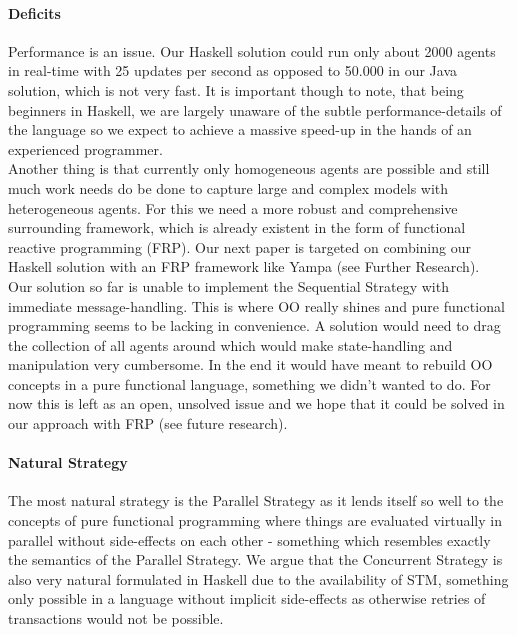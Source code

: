 \paragraph{Deficits}
Performance is an issue. Our Haskell solution could run only about 2000 agents in real-time with 25 updates per second as opposed to 50.000 in our Java solution, which is not very fast. It is important though to note, that being beginners in Haskell, we are largely unaware of the subtle performance-details of the language so we expect to achieve a massive speed-up in the hands of an experienced programmer. \\

Another thing is that currently only homogeneous agents are possible and still much work needs do be done to capture large and complex models with heterogeneous agents. For this we need a more robust and comprehensive surrounding framework, which is already existent in the form of functional reactive programming (FRP). Our next paper is targeted on combining our Haskell solution with an FRP framework like Yampa (see Further Research). \\ 

Our solution so far is unable to implement the Sequential Strategy with immediate message-handling. This is where OO really shines and pure functional programming seems to be lacking in convenience. A solution would need to drag the collection of all agents around which would make state-handling and manipulation very cumbersome. In the end it would have meant to rebuild OO concepts in a pure functional language, something we didn't wanted to do. For now this is left as an open, unsolved issue and we hope that it could be solved in our approach with FRP (see future research).

\paragraph{Natural Strategy}
The most natural strategy is the Parallel Strategy as it lends itself so well to the concepts of pure functional programming where things are evaluated virtually in parallel without side-effects on each other - something which resembles exactly the semantics of the Parallel Strategy. We argue that the Concurrent Strategy is also very natural formulated in Haskell due to the availability of STM, something only possible in a language without implicit side-effects as otherwise retries of transactions would not be possible.



